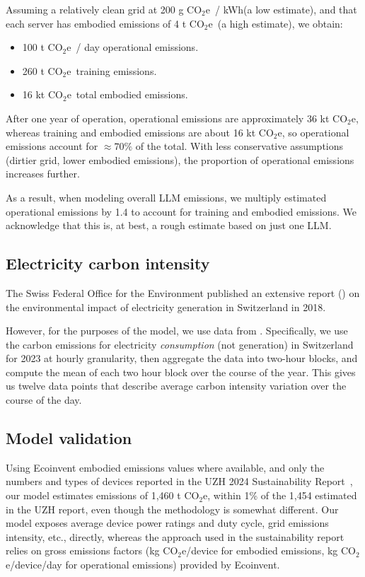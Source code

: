 \documentclass[11pt]{article}
\newcommand{\coe}{CO$_2$e}
\newcommand{\gcoe}{g \coe}
\newcommand{\kgcoe}{k\gcoe}
\newcommand{\gcoekwh}{\gcoe\ / kWh}
\begin{document}
Assuming a relatively clean grid at 200 \gcoekwh (a low estimate), and that each server has embodied emissions of 4 t \coe\ (a high estimate),
we obtain:
\begin{itemize}
    \item 100 t \coe\ / day operational emissions.
    \item 260 t \coe\ training emissions.
    \item 16 kt \coe\ total embodied emissions.
\end{itemize}

After one year of operation, operational emissions are approximately 36 kt \coe, whereas training and embodied emissions are about 16 kt \coe,
so operational emissions account for $\approx 70\%$ of the total. With less conservative assumptions (dirtier grid, lower embodied emissions),
the proportion of operational emissions increases further.

As a result, when modeling overall LLM emissions, we multiply estimated operational emissions by 1.4 to account for training and embodied emissions.
We acknowledge that this is, at best, a rough estimate based on just one LLM.

\subsection{Electricity carbon intensity}

The Swiss Federal Office for the Environment published an extensive report (\cite{krebs2018umweltbilanz})
on the environmental impact of electricity generation in Switzerland in 2018.

However, for the purposes of the model, we use data from \textcite{electricitymaps}. Specifically,
we use the carbon emissions for electricity {\em consumption} (not generation) in Switzerland for 2023
at hourly granularity, then aggregate the data into two-hour blocks, and compute the mean of each two
hour block over the course of the year. This gives us twelve data points that describe average
carbon intensity variation over the course of the day.

\subsection{Model validation}

Using Ecoinvent embodied emissions values where available, and only the numbers and types of devices reported in the UZH 2024 Sustainability Report~\cite{uzh:sustainability:report}, our model estimates emissions of 1,460 t \coe, within 1\% of the 1,454 estimated in the UZH report, even though the methodology is somewhat different. Our model exposes average device power ratings and duty cycle, grid emissions intensity, etc., directly, whereas the approach used in the sustainability report relies on gross emissions factors (\kgcoe/device for embodied emissions, \kgcoe/device/day for operational emissions) provided by Ecoinvent.
\end{document}
